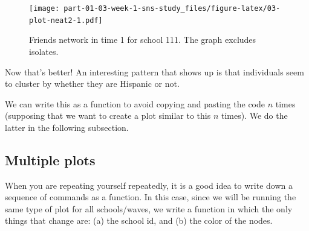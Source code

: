 \documentclass[]{book}
\newenvironment{Shaded}{\begin{snugshade}}{\end{snugshade}}
\newcommand{\CommentTok}[1]{\textcolor[rgb]{0.56,0.35,0.01}{\textit{#1}}}
\newcommand{\ControlFlowTok}[1]{\textcolor[rgb]{0.13,0.29,0.53}{\textbf{#1}}}
\newcommand{\DataTypeTok}[1]{\textcolor[rgb]{0.13,0.29,0.53}{#1}}
\newcommand{\DecValTok}[1]{\textcolor[rgb]{0.00,0.00,0.81}{#1}}
\newcommand{\FloatTok}[1]{\textcolor[rgb]{0.00,0.00,0.81}{#1}}
\newcommand{\KeywordTok}[1]{\textcolor[rgb]{0.13,0.29,0.53}{\textbf{#1}}}
\newcommand{\NormalTok}[1]{#1}
\newcommand{\OperatorTok}[1]{\textcolor[rgb]{0.81,0.36,0.00}{\textbf{#1}}}
\newcommand{\OtherTok}[1]{\textcolor[rgb]{0.56,0.35,0.01}{#1}}
\newcommand{\StringTok}[1]{\textcolor[rgb]{0.31,0.60,0.02}{#1}}
\begin{document}
\begin{figure}
\centering
\texttt{[image: part-01-03-week-1-sns-study\_files/figure-latex/03-plot-neat2-1.pdf]}
\caption{\label{fig:03-plot-neat2}Friends network in time 1 for school 111. The graph excludes isolates.}
\end{figure}

Now that's better! An interesting pattern that shows up is that individuals seem to cluster by whether they are Hispanic or not.

We can write this as a function to avoid copying and pasting the code \(n\) times (supposing that we want to create a plot similar to this \(n\) times). We do the latter in the following subsection.

\hypertarget{multiple-plots}{%
\subsection{Multiple plots}\label{multiple-plots}}

When you are repeating yourself repeatedly, it is a good idea to write down a sequence of commands as a function. In this case, since we will be running the same type of plot for all schools/waves, we write a function in which the only things that change are: (a) the school id, and (b) the color of the nodes.

\begin{Shaded}
\end{Shaded}
\end{document}
